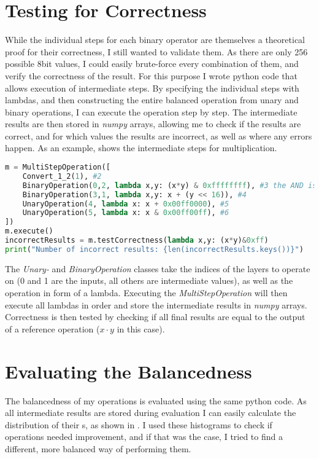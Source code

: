 \section{Testing for Correctness}
\label{correctness}
While the individual steps for each binary operator are themselves a theoretical proof for their correctness, I still wanted to validate them.
As there are only 256 possible 8bit values, I could easily brute-force every combination of them, and verify the correctness of the result.
For this purpose I wrote python code that allows execution of intermediate steps.
By specifying the individual steps with lambdas, and then constructing the entire balanced operation from unary and binary operations, I can execute the operation step by step.
The intermediate results are then stored in \emph{numpy} arrays, allowing me to check if the results are correct, and for which values the results are incorrect, as well as where any errors happen.
As an example,  shows the intermediate steps for multiplication.

\begin{lstlisting}[language=python, caption=Step-by-step execution of balanced multiplication, label=lst:multiop]
m = MultiStepOperation([
    Convert_1_2(1), #2
    BinaryOperation(0,2, lambda x,y: (x*y) & 0xffffffff), #3 the AND is required due to python's arbitrary precision integers
    BinaryOperation(3,1, lambda x,y: x + (y << 16)), #4
    UnaryOperation(4, lambda x: x + 0x00ff0000), #5
    UnaryOperation(5, lambda x: x & 0x00ff00ff), #6
])
m.execute()
incorrectResults = m.testCorrectness(lambda x,y: (x*y)&0xff)
print("Number of incorrect results: {len(incorrectResults.keys())}")
\end{lstlisting}

The \emph{Unary-} and \emph{BinaryOperation} classes take the indices of the layers to operate on (0 and 1 are the inputs, all others are intermediate values), as well as the operation in form of a lambda.
Executing the \emph{MultiStepOperation} will then execute all lambdas in order and store the intermediate results in \emph{numpy} arrays.
Correctness is then tested by checking if all final results are equal to the output of a reference operation ($x \cdot y$ in this case).

\section{Evaluating the Balancedness}
\label{balance-eval}
The balancedness of my operations is evaluated using the same python code.
As all intermediate results are stored during evaluation I can easily calculate the distribution of their \hammingw s, as shown in .
I used these histograms to check if operations needed improvement, and if that was the case, I tried to find a different, more balanced way of performing them.

